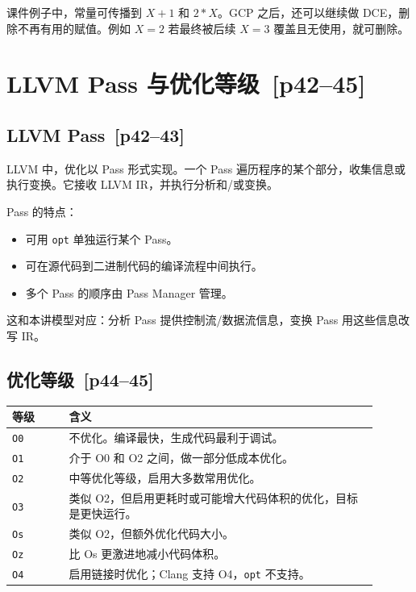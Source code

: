 \documentclass[UTF8,fontset=none,11pt]{ctexart}
\newenvironment{defbox}[1][]{%
  \par\medskip\noindent{\color{defrule}\rule{\linewidth}{1.1pt}}\par\nopagebreak
  \noindent{\bfseries\color{defrule}#1}\par\nopagebreak\smallskip}%
  {\par\nopagebreak\smallskip\noindent{\color{defrule}\rule{\linewidth}{0.4pt}}\par\medskip}
\newcommand{\pg}[1]{\texorpdfstring{{\small\color{graytext}\,[p#1]}}{ [p#1]}}
\begin{document}
课件例子中，常量可传播到 \(X+1\) 和 \(2*X\)。GCP 之后，还可以继续做 DCE，删除不再有用的赋值。例如 \(X=2\) 若最终被后续 \(X=3\) 覆盖且无使用，就可删除。

\section{LLVM Pass 与优化等级 \pg{42--45}}

\subsection{LLVM Pass \pg{42--43}}

\begin{defbox}[LLVM Pass]
LLVM 中，优化以 Pass 形式实现。一个 Pass 遍历程序的某个部分，收集信息或执行变换。它接收 LLVM IR，并执行分析和/或变换。
\end{defbox}

Pass 的特点：

\begin{itemize}
  \item 可用 \texttt{opt} 单独运行某个 Pass。
  \item 可在源代码到二进制代码的编译流程中间执行。
  \item 多个 Pass 的顺序由 Pass Manager 管理。
\end{itemize}

这和本讲模型对应：分析 Pass 提供控制流/数据流信息，变换 Pass 用这些信息改写 IR。

\subsection{优化等级 \pg{44--45}}

\begin{longtable}{L{0.14\linewidth}L{0.76\linewidth}}
\toprule
等级 & 含义 \\
\midrule
\texttt{O0} & 不优化。编译最快，生成代码最利于调试。\\
\texttt{O1} & 介于 O0 和 O2 之间，做一部分低成本优化。\\
\texttt{O2} & 中等优化等级，启用大多数常用优化。\\
\texttt{O3} & 类似 O2，但启用更耗时或可能增大代码体积的优化，目标是更快运行。\\
\texttt{Os} & 类似 O2，但额外优化代码大小。\\
\texttt{Oz} & 比 Os 更激进地减小代码体积。\\
\texttt{O4} & 启用链接时优化；Clang 支持 O4，\texttt{opt} 不支持。\\
\bottomrule
\end{longtable}
\end{document}
